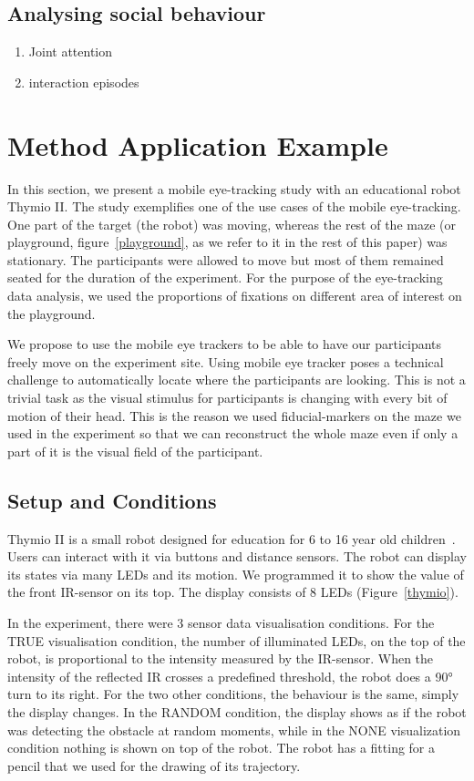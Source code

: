 \documentclass{sig-alternate}
\begin{document}
\subsection{Analysing social behaviour}

\begin{enumerate}
\item Joint attention
\item interaction episodes
\end{enumerate}


\section{Method Application Example}
In this section, we present a mobile eye-tracking study with an educational robot Thymio II. The study exemplifies one of the use cases of the mobile eye-tracking. One part of the target (the robot) was moving, whereas the rest of the maze (or playground, figure~\ref{playground}, as we refer to it in the rest of this paper) was stationary. The participants were allowed to move but most of them remained seated for the duration of the experiment. For the purpose of the eye-tracking data analysis, we used the proportions of fixations on different  area of interest on the playground.

We propose to use the mobile eye trackers to be able to have our participants
freely move on the experiment site. Using mobile eye tracker poses a technical
challenge to automatically locate where the participants are looking. This is
not a trivial task as the visual stimulus for participants is changing with
every bit of motion of their head. This is the reason we used fiducial-markers
on the maze we used in the experiment so that we can reconstruct the whole maze
even if only a part of it is the visual field of the participant.

\subsection{Setup and Conditions}

Thymio II is a small robot designed for education for 6 to 16 year old
children~\cite{magnenat2012programming, riedo2012two}. Users can interact with
it via buttons and distance sensors. The robot can display its states via many
LEDs and its motion. We programmed it to show the value of the front IR-sensor
on its top. The display consists of 8 LEDs (Figure~\ref{thymio}).

In the experiment, there were 3 sensor data visualisation conditions.  For the
{\sf TRUE} visualisation condition, the number of illuminated LEDs, on the top of the
robot, is proportional to the intensity measured by the IR-sensor. When the
intensity of the reflected IR crosses a predefined threshold, the robot does a
90° turn to its right. For the two other conditions, the behaviour is the same,
simply the display changes. In the {\sf RANDOM} condition, the display shows as if the
robot was detecting the obstacle at random moments, while in the {\sf NONE}
visualization condition nothing is shown on top of the robot. The robot has a
fitting for a pencil that we used for the drawing of its trajectory.
\end{document}
